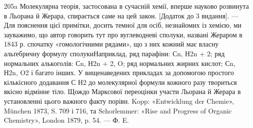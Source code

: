 205a Молекулярна теорія, застосована в сучасній хемії, вперше науково
розвинута в Льорана й Жерара, спирається саме на цей закон. [Додаток
до 3 видання]. — Для пояснення цієї примітки, досить темної для осіб,
незнайомих із хемією, ми зауважимо, що автор говорить тут про вуглеводневі
сполуки, названі Жераром в 1843 р. спочатку «гомологічними
рядами», що з них кожний має власну альґебричну формулу сполукиНаприклад,
ряд парафіни: Сn, Н2n + 2; ряд нормальних алькоголів:
Сn, Н2n + 2, O; ряд нормальних жирних кислот; Сn, Н2n, O2 і багато інших.
У вищенаведених прикладах за допомогою простого кількісного додавання
С Н2 до молекулярної формули кожного разу твориться якісно відмінне
тіло. Щождо Марксової переоцінки участи Льорана й Жерара в установленні
цього важного факту порівн. Kopp: «Entwicklung der Chemie»,
München 1873, S. 709 і 716, та Schorlemmer: «Rise and Progress of
Organic Chemistry», London 1879, p. 54. — Ф. E.
